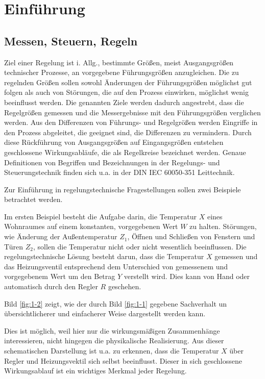 \section{Einführung}


\subsection{Messen, Steuern, Regeln}

Ziel einer Regelung ist i. Allg., bestimmte Größen, meist Ausgangsgrößen technischer Prozesse, an vorgegebene Führungsgrößen anzugleichen.
Die zu regelnden Größen sollen sowohl Änderungen der Führungsgrößen möglichst gut folgen als auch von Störungen, die auf den Prozess einwirken, möglichst wenig beeinflusst werden.
Die genannten Ziele werden dadurch angestrebt, dass die Regelgrößen gemessen und die Messergebnisse mit den Führungsgrößen verglichen werden.
Aus den Differenzen von Führungs- und Regelgrößen werden Eingriffe in den Prozess abgeleitet, die geeignet sind, die Differenzen zu vermindern.
Durch diese Rückführung von Ausgangsgrößen auf Eingangsgrößen entstehen geschlossene Wirkungsabläufe, die als Regelkreise bezeichnet werden.
Genaue Definitionen von Begriffen und Bezeichnungen in der Regelungs- und Steuerungstechnik finden sich u.a. in der DIN IEC 60050-351 Leittechnik.

Zur Einführung in regelungstechnische Fragestellungen sollen zwei Beispiele betrachtet werden.

Im ersten Beispiel besteht die Aufgabe darin, die Temperatur \(X\) eines Wohnraumes auf einem konstanten, vorgegebenen Wert \(W\) zu halten.
Störungen, wie Änderung der Außentemperatur \(Z_1\), Öffnen und Schließen von Fenstern und Türen \(Z_2\), sollen die Temperatur nicht oder nicht wesentlich beeinflussen.
Die regelungstechnische Lösung besteht darun, dass die Temperatur \(X\) gemessen und das Heizungsventil entsprechend dem Unterschied von gemessenem und vorgegebenem Wert um den Betrag \(Y\) verstellt wird.
Dies kann von Hand oder automatisch durch den Regler \(R\) geschehen.

Bild \ref{fig:1-2} zeigt, wie der durch Bild \ref{fig:1-1} gegebene Sachverhalt un übersichtlicherer und einfacherer Weise dargestellt werden kann.

Dies ist möglich, weil hier nur die wirkungsmäßigen Zusammenhänge interessieren, nicht hingegen die physikalische Realisierung.
Aus dieser schematischen Darstellung ist u.a. zu erkennen, dass die Temperatur \(X\) über Regler und Heizungsvektil sich selbst beeinflusst.
Dieser in sich geschlossene Wirkungsablauf ist ein wichtiges Merkmal jeder Regelung.

